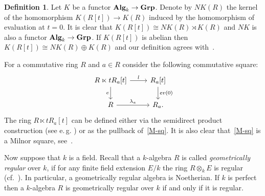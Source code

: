 \documentclass[oneside, 11pt]{amsart} \pdfoutput=1
\numberwithin{equation}{section}
\theoremstyle{definition}
\newtheorem{df}[lemma]{Definition}
\newcommand{\catname}[1]{{\normalfont\textbf{#1}}} %
\begin{document}
\begin{df}\label{df:NK}
Let $K$ be a functor $\catname{Alg}_k \to \catname{Grp}$.
Denote by $NK(R)$ the kernel of the homomorphism $K(R[t]) \to K(R)$ induced by the homomorphism of evaluation at $t=0$. It is clear that $K(R[t]) \cong NK(R) \rtimes K(R)$ and $NK$ is also a functor $\catname{Alg}_k \to \catname{Grp}$. If $K(R[t])$ is abelian then $K(R[t]) \cong NK(R) \oplus K(R)$ and our definition agrees with~\cite[Def.~III.3.3]{Kbook}.
\end{df}

For a commutative ring $R$ and $a \in R$ consider the following commutative square:
  \begin{equation} \label{M-sq} \begin{tikzcd} R \ltimes t R_a[t] \ar{r}{l} \ar{d}[swap]{e} & R_a[t] \ar{d}{ev(0)} \\ R \ar{r}{\lambda_a} & R_a. \end{tikzcd}\end{equation}
  The ring $R \ltimes tR_a[t]$ can be defined either via the semidirect product construction (see e.\,g. \cite[Definition~3.2]{S15}) or as the pullback of~\eqref{M-sq}.
  It is also clear that~\eqref{M-sq} is a Milnor square, see~\cite[Example~I.2.6]{Kbook}.

Now suppose that $k$ is a field. Recall that a $k$-algebra $R$ is called {\it geometrically regular} over $k$, if for any finite field extension $E/k$ the ring $R\otimes_kE$ is regular (cf.~\cite[p.~137]{Sw98}). In particular, a geometrically regular algebra is Noetherian. If $k$ is perfect then a $k$-algebra $R$ is geometrically regular over $k$ if and only if it is regular.
\end{document}
